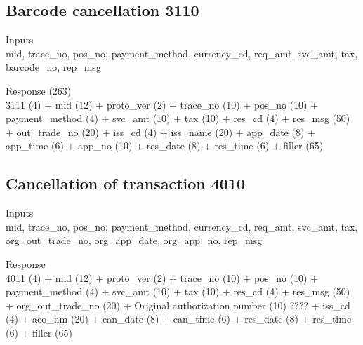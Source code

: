\documentclass[12pt]{article}
\begin{document}
\subsection{Barcode cancellation 3110}
    \begin{description}
        \item Inputs \\
            mid, trace\_no, pos\_no, 
            payment\_method, currency\_cd, req\_amt, 
            svc\_amt, tax, barcode\_no, rep\_msg \\
        \item Response (263) \\
        3111 (4) + mid (12) + proto\_ver (2) 
        + trace\_no (10) + pos\_no (10) + payment\_method (4) 
        + svc\_amt (10) + tax (10) + res\_cd (4)
        + res\_msg (50) + out\_trade\_no (20) + iss\_cd (4)
        + iss\_name (20) + app\_date (8) + app\_time (6) 
        + app\_no (10) + res\_date (8) + res\_time (6)
        + filler (65)
    \end{description}

\subsection{Cancellation of transaction 4010}
    \begin{description}
        \item Inputs \\
            mid, trace\_no, pos\_no, payment\_method, 
            currency\_cd, req\_amt, svc\_amt, 
            tax, org\_out\_trade\_no, org\_app\_date, org\_app\_no,
            rep\_msg\\
        \item Response \\
        4011 (4) + mid (12) + proto\_ver (2) 
        + trace\_no (10) + pos\_no (10) + payment\_method (4) 
        + svc\_amt (10) + tax (10) + res\_cd (4)
        + res\_msg (50) + org\_out\_trade\_no (20) + Original authorization number (10) ????
        + iss\_cd (4) + aco\_nm (20) + can\_date (8)
        + can\_time (6) + res\_date (8) + res\_time (6)
        + filler (65)
    \end{description}
\end{document}
